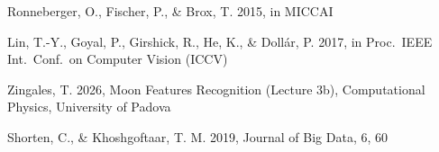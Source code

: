 \documentclass{aa}
\begin{document}
\begin{thebibliography}{}
    Ronneberger, O., Fischer, P., \& Brox, T. 2015,
       in MICCAI

    Lin, T.-Y., Goyal, P., Girshick, R., He, K., \& Doll\'ar, P. 2017,
       in Proc.\ IEEE Int.\ Conf.\ on Computer Vision (ICCV)

    Zingales, T. 2026,
       Moon Features Recognition (Lecture 3b), Computational Physics, University of Padova

    Shorten, C., \& Khoshgoftaar, T. M. 2019,
       Journal of Big Data, 6, 60


\end{thebibliography}
\end{document}
